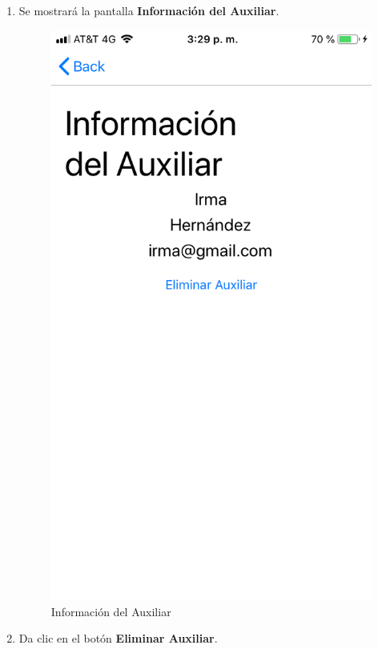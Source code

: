 \begin{enumerate}
	\item Se mostrará la pantalla \textbf{Información del Auxiliar}.
	\newpage
	\begin{figure}[!htbp]			
		\hypertarget{fig:InfoAuxiliar}{\hspace{1pt}}
		\begin{center}
			\includegraphics[height=0.4\textheight]{Paciente/EliminarAuxiliar/images/InfoAuxiliar}
			\caption{Información del Auxiliar}
			\label{fig:InfoAuxiliar}
		\end{center}
	\end{figure}

	\item Da clic en el botón \textbf{Eliminar Auxiliar}.
	
\end{enumerate}


